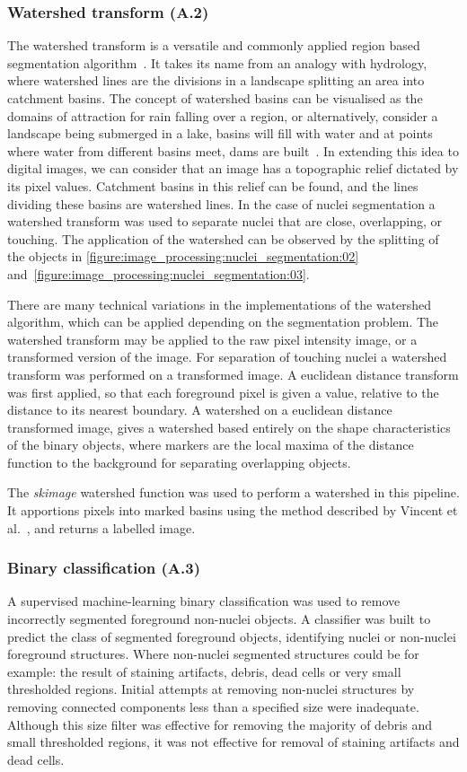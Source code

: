 \subsubsection{Watershed transform (A.2)}
The watershed transform is a versatile and commonly applied region based segmentation algorithm~\cite{Vincent1991}. It takes its name from an analogy with hydrology, where watershed lines are the divisions in a landscape splitting an area into catchment basins. The concept of watershed basins can be visualised as the domains of attraction for rain falling over a region, or alternatively, consider a landscape being submerged in a lake, basins will fill with water and at points where water from different basins meet, dams are built~\cite{Roerdink2000}. In extending this idea to digital images, we can consider that an image has a topographic relief dictated by its pixel values. Catchment basins in this relief can be found, and the lines dividing these basins are watershed lines. In the case of nuclei segmentation a watershed transform was used to separate nuclei that are close, overlapping, or touching. The application of the watershed can be observed by the splitting of the objects in \autoref{figure:image_processing:nuclei_segmentation:02} and~\ref{figure:image_processing:nuclei_segmentation:03}.

There are many technical variations in the implementations of the watershed algorithm, which can be applied depending on the segmentation problem. The watershed transform may be applied to the raw pixel intensity image, or a transformed version of the image. For separation of touching nuclei a watershed transform was performed on a transformed image. A euclidean distance transform was first applied, so that each foreground pixel is given a value, relative to the distance to its nearest boundary. A watershed on a euclidean distance transformed image, gives a watershed based entirely on the shape characteristics of the binary objects, where markers are the local maxima of the distance function to the background for separating overlapping objects.

The \emph{skimage} watershed function was used to perform a watershed in this pipeline. It apportions pixels into marked basins using the method described by Vincent et al.~\cite{Vincent1991}, and returns a labelled image.

\subsubsection{Binary classification (A.3)}
A supervised machine-learning binary classification was used to remove incorrectly segmented foreground non-nuclei objects. A classifier was built to predict the class of segmented foreground objects, identifying nuclei or non-nuclei foreground structures. Where non-nuclei segmented structures could be for example: the result of staining artifacts, debris, dead cells or very small thresholded regions. Initial attempts at removing non-nuclei structures by removing connected components less than a specified size were inadequate. Although this size filter was effective for removing the majority of debris and small thresholded regions, it was not effective for removal of staining artifacts and dead cells.

